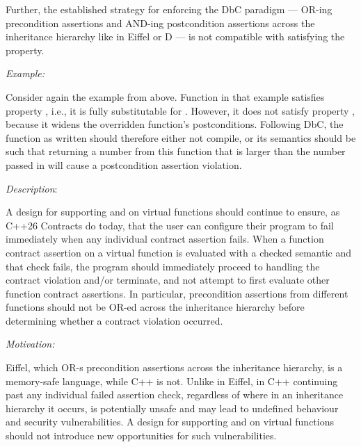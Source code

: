 Further, the established strategy for enforcing the DbC paradigm --- OR-ing precondition assertions and AND-ing postcondition assertions across the inheritance hierarchy like in Eiffel or D --- is not compatible with satisfying the  property.


\emph{Example:}

Consider again the example from  above. Function  in that example satisfies property , i.e., it is fully substitutable for . However, it does not satisfy property , because it widens the overridden function's postconditions. Following DbC, the function  as written should therefore either not compile, or its semantics should be such that returning a number from this function that is larger than the number passed in will cause a postcondition assertion violation.


\emph{Description}:

A design for supporting  and  on virtual functions should continue to ensure, as C++26 Contracts do today, that the user can configure their program to fail immediately when any individual contract assertion fails. When a function contract assertion on a virtual function is evaluated with a checked semantic and that check fails, the program should immediately proceed to handling the contract violation and/or terminate, and not attempt to first evaluate other function contract assertions. In particular, precondition assertions from different functions should not be OR-ed across the inheritance hierarchy before determining whether a contract violation occurred.

\emph{Motivation:}

Eiffel, which OR-s precondition assertions across the inheritance hierarchy, is a memory-safe language, while C++ is not. Unlike in Eiffel, in C++ continuing past any individual failed assertion check, regardless of where in an inheritance hierarchy it occurs, is potentially unsafe and may lead to undefined behaviour and security vulnerabilities. A design for supporting  and  on virtual functions should not introduce new opportunities for such vulnerabilities.

